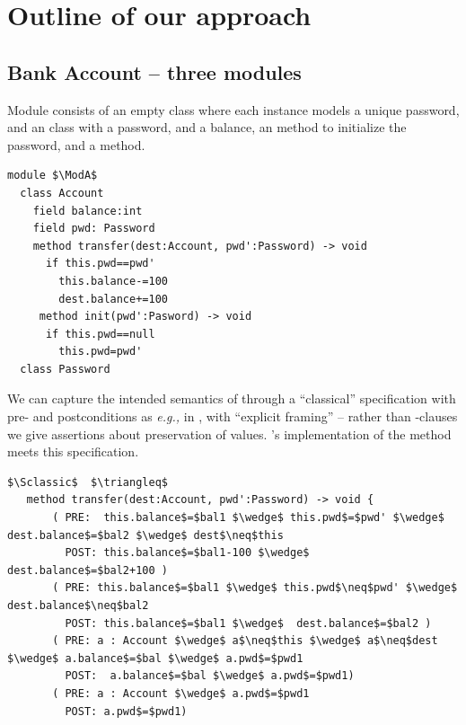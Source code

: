 

\section{Outline of our approach}
\label{s:outline}

 \subsection{Bank Account -- three modules}
\label{s:bank}
  
Module \ModA consists of an empty 
 class where each instance models a unique password, and an   class with a password, and a balance, an  method to 
initialize the password, and 
a
 method. 
%
%
%
%
% 
\begin{lstlisting}[mathescape=true, language=Chainmail, frame=lines]
module $\ModA$
  class Account
    field balance:int 
    field pwd: Password
    method transfer(dest:Account, pwd':Password) -> void
      if this.pwd==pwd'
        this.balance-=100
        dest.balance+=100
     method init(pwd':Pasword) -> void
      if this.pwd==null
        this.pwd=pwd'
  class Password
\end{lstlisting}
%
\noindent 
We can capture the intended
semantics of  
through  {a}  ``classical''
specification with pre- and postconditions as \emph{e.g.,} in \cite{Leavens-etal07,dafny13},
with ``explicit framing'' --   
 {rather than -clauses we give assertions   about preservation of values.}
\ModA's implementation of the  method meets
this specification.



\begin{lstlisting}[mathescape=true, frame=lines, language=Chainmail]
$\Sclassic$  $\triangleq$
   method transfer(dest:Account, pwd':Password) -> void {
       ( PRE:  this.balance$=$bal1 $\wedge$ this.pwd$=$pwd' $\wedge$ dest.balance$=$bal2 $\wedge$ dest$\neq$this 
         POST: this.balance$=$bal1-100 $\wedge$  dest.balance$=$bal2+100 )
       ( PRE: this.balance$=$bal1 $\wedge$ this.pwd$\neq$pwd' $\wedge$ dest.balance$\neq$bal2
         POST: this.balance$=$bal1 $\wedge$  dest.balance$=$bal2 )
       ( PRE: a : Account $\wedge$ a$\neq$this $\wedge$ a$\neq$dest  $\wedge$ a.balance$=$bal $\wedge$ a.pwd$=$pwd1
         POST:  a.balance$=$bal $\wedge$ a.pwd$=$pwd1)
       ( PRE: a : Account $\wedge$ a.pwd$=$pwd1  
         POST: a.pwd$=$pwd1)       
\end{lstlisting}
 
